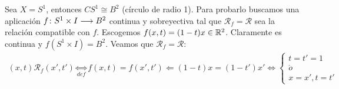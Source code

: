 \documentclass[GTS.tex]{subfiles}
\begin{document}
\begin{ej} Sea $X=S^1$, entonces $CS^1\cong B^2$ (círculo de radio 1). Para probarlo buscamos una aplicación $f\colon{S^1\times I}\longrightarrow{B^2}$ continua y sobreyectiva tal que $\mathcal{R}_f=\mathcal{R}$ sea la relación compatible con $f$. Escogemos $f(x,t)=(1-t)x\in\mathbb{R}^2$. Claramente es continua y $f(S^1\times I)=B^2$. Veamos que $\mathcal{R}_f=\mathcal{R}$:
\begin{gather*}
(x,t)\mathcal{R}_f(x',t')\underset{def}{\Leftrightarrow}f(x,t)=f(x',t')\Leftarrow (1-t)x=(1-t')x'\Leftrightarrow\left\{\begin{array}{c}
t=t'=1 \\
\acute{o}\\
x=x', t=t'
\end{array}\right.
\end{gather*}
\end{ej}
\end{document}
